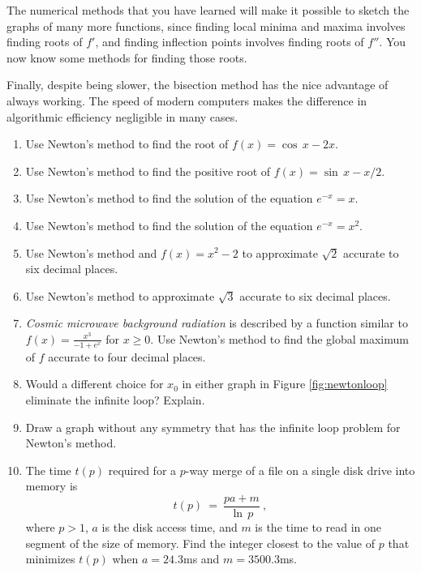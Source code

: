 The numerical methods that you have learned will make it possible to sketch the
graphs of many more functions, since
finding local minima and maxima involves finding roots of $f'$, and finding
inflection points involves finding roots of $f''$. You now know some methods for
finding those roots.

Finally, despite being slower, the bisection method has the nice
advantage of always working. The speed of modern computers makes the difference
in algorithmic efficiency negligible in many cases.\vspace{1mm}

\divider
\vspace{2mm}

\startexercises\label{sec4dot3}
{\small
{}
\begin{enumerate}[\bfseries 1.]
 \item Use Newton's method to find the root of $f(x) = \cos\,x - 2x$.
 \item Use Newton's method to find the positive root of $f(x) = \sin\,x - x/2$.
 \item Use Newton's method to find the solution of the equation
  $e^{-x} = x$.
 \item Use Newton's method to find the solution of the equation
  $e^{-x} = x^2$.
 \item Use Newton's method and $f(x) = x^2 - 2$ to approximate $\sqrt{2}$
  accurate to six decimal places.
 \item Use Newton's method to approximate $\sqrt{3}$ accurate to six decimal
  places.
 \item \emph{Cosmic microwave background radiation} is described by a function
  similar to $f(x) = \frac{x^3}{-1 + e^x}$ for $x \ge 0$. Use Newton's method to
  find the global maximum of $f$ accurate to four decimal places.
 \item Would a different choice for $x_0$ in either graph in Figure
  \ref{fig:newtonloop} eliminate the infinite loop? Explain.
 \item Draw a graph without any symmetry that has the infinite loop problem
  for Newton's method.
 \item The time $t(p)$ required for a $p$-way merge of a file on a single disk
  drive into memory is
\[
t(p) ~=~ \frac{pa + m}{\ln\,p} ~,
\]
where $p>1$, $a$ is the disk access time, and $m$ is the time to read in one
segment of the size of memory. Find the integer closest to the value of $p$ that
minimizes $t(p)$ when $a = 24.3$ms and $m=3500.3$ms.
\end{enumerate}
}
\newpage
